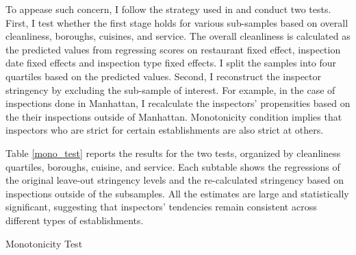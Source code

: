 \documentclass[12pt]{article}
\begin{document}
To appease such concern, I follow the strategy used in \cite{bhuller_16} and conduct two tests. First, I test whether the first stage holds for various sub-samples based on overall cleanliness, boroughs, cuisines, and service. The overall cleanliness is calculated as the predicted values from regressing scores on restaurant fixed effect, inspection date fixed effects and inspection type fixed effects. I split the samples into four quartiles based on the predicted values. Second, I reconstruct the inspector stringency by excluding the sub-sample of interest. For example, in the case of inspections done in Manhattan, I recalculate the inspectors' propensities based on the their inspections outside of Manhattan. Monotonicity condition implies that inspectors who are strict for certain establishments are also strict at others. 

Table \ref{mono_test} reports the results for the two tests, organized by cleanliness quartiles, boroughs, cuisine, and service. Each subtable shows the regressions of the original leave-out stringency levels and the re-calculated stringency based on inspections outside of the subsamples. All the estimates are large and statistically significant, suggesting that inspectors' tendencies remain consistent across different types of establishments. 

\begin{table}[!htbp]
\caption{Monotonicity Test}
\label{mono_test}

\subfloat[Boroughs]{\scalebox{0.6}{  }}

\subfloat[Cuisines]{\scalebox{0.6}{   }}

\subfloat[Service]{\scalebox{0.6}{   }}

\end{table}
\end{document}
